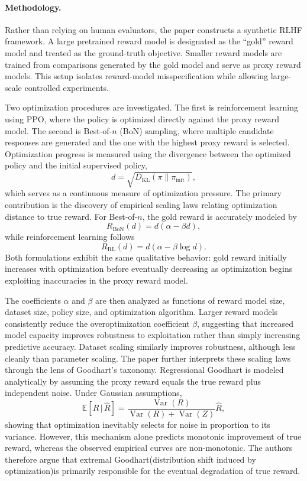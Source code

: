 \documentclass[11pt]{article}
\begin{document}
\paragraph{Methodology.}

Rather than relying on human evaluators, the paper constructs a synthetic RLHF framework. A large pretrained reward model is designated as the ``gold'' reward model and treated as the ground-truth objective. Smaller reward models are trained from comparisons generated by the gold model and serve as proxy reward models. This setup isolates reward-model misspecification while allowing large-scale controlled experiments.

Two optimization procedures are investigated.
The first is reinforcement learning using PPO, where the policy is optimized directly against the proxy reward model. The second is Best-of-$n$ (BoN) sampling, where multiple candidate responses are generated and the one with the highest proxy reward is selected.
Optimization progress is measured using the divergence between the optimized policy and the initial supervised policy,
\[
d=\sqrt{D_{\mathrm{KL}}(\pi\|\pi_{\mathrm{init}})},
\]
which serves as a continuous measure of optimization pressure.
The primary contribution is the discovery of empirical scaling laws relating optimization distance to true reward. For Best-of-$n$, the gold reward is accurately modeled by
\[
R_{\mathrm{BoN}}(d)
=
d(\alpha-\beta d),
\]
while reinforcement learning follows
\[
R_{\mathrm{RL}}(d)
=
d(\alpha-\beta\log d).
\]
Both formulations exhibit the same qualitative behavior: gold reward initially increases with optimization before eventually decreasing as optimization begins exploiting inaccuracies in the proxy reward model.

The coefficients $\alpha$ and $\beta$ are then analyzed as functions of reward model size, dataset size, policy size, and optimization algorithm. Larger reward models consistently reduce the overoptimization coefficient $\beta$, suggesting that increased model capacity improves robustness to exploitation rather than simply increasing predictive accuracy. Dataset scaling similarly improves robustness, although less cleanly than parameter scaling.
The paper further interprets these scaling laws through the lens of Goodhart's taxonomy. Regressional Goodhart is modeled analytically by assuming the proxy reward equals the true reward plus independent noise. Under Gaussian assumptions,
\[
\mathbb{E}[R\,|\,\hat{R}]
=
\frac{\operatorname{Var}(R)}
{\operatorname{Var}(R)+\operatorname{Var}(Z)}
\hat{R},
\]
showing that optimization inevitably selects for noise in proportion to its variance. However, this mechanism alone predicts monotonic improvement of true reward, whereas the observed empirical curves are non-monotonic. The authors therefore argue that extremal Goodhart(distribution shift induced by optimization)is primarily responsible for the eventual degradation of true reward.
\end{document}
